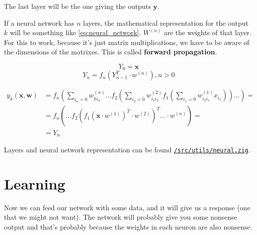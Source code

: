 \documentclass[a4paper,12pt]{article}
\theoremstyle{mytheoremstyle}
\theoremstyle{mytheoremstyle}
\theoremstyle{myproblemstyle}
\begin{document}
    The last layer will be the one giving the outputs $ \mathbf{y} $.

    If a neural network has $ n $ layers, the mathematical representation for
    the output $ k $ will be something like \eqref{eq:neural_network}. $
    W^{(n)} $ are the weights of that layer. For this to work, because it's
    just matrix multiplications, we have to be aware of the dimensions of the
    matrixes. This is called \textbf{forward propagation}.

    \begin{equation}
        Y_{0} = \textbf{x}
    \end{equation}
    \begin{equation}
        Y_{n} = f_{n} \left( Y_{n - 1}^{T} \cdot w^{(n)} \right), n > 0
    \end{equation}

    \begin{equation}
        \begin{split}
            y_{k}(\mathbf{x}, \mathbf{w}) & = f_{n} \left( \displaystyle\sum_{i_{n}=0} w_{k i_{n}}^{(n)} \hdots f_{2} \left( \displaystyle\sum_{i_{2}=0} w_{i_{3}i_{2}}^{(2)} f_{1} \left( \displaystyle\sum_{i_{1}=0} w_{i_{2}i_{1}}^{(1)}x_{i_{1}} \right) \right) \hdots \right) = \\
            & = f_{n} \left( \hdots f_{2} \left( f_{1} \left( \mathbf{x} \cdot w^{(1)} \right)^{T} \cdot w^{(2)} \right)^{T} \hdots \cdot w^{(n)} \right) = \\
            & = Y_{n}
        \end{split}
        \label{eq:neural_network}
    \end{equation}



    Layers and neural network representation can be found
    \href{run:../src/utils/neural.zig}{\texttt{/src/utils/neural.zig}}.


    \section{Learning}

    Now we can feed our network with some data, and it will give us a response
    (one that we might not want). The network will probably give you some
    nonsense output and that's probably because the weights in each neuron are
    also nonsense.
\end{document}
